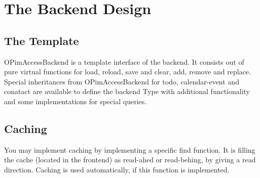 \section{The Backend Design}

\subsection{The Template}
OPimAccessBackend is a template interface of the backend. 
It consists out of pure virtual functions for
load, reload, save and clear, add, remove and replace.
Special inheritances from OPimAccessBackend for todo, calendar-event and conatact are available to 
define the backend Type with additional functionality and some implementations for special queries.

\subsection{Caching}
You may implement caching by implementing a specific find function. It is filling the cache 
(located in the frontend) as read-ahed or read-behing, by giving a read direction. 
Caching is used automatically, if this function is implemented.
